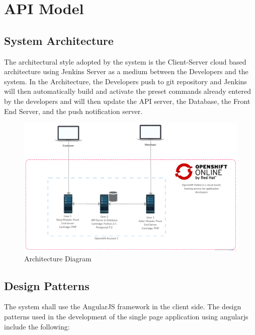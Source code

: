 \documentclass{report}
\begin{document}
\chapter{API Model}
\label{chap:API Model}
\section{System Architecture}
The architectural style adopted by the system is the Client-Server cloud based architecture using Jenkins Server as a medium between the Developers and the system. In the Architecture, the Developers push to git repository and Jenkins will then automatically build and activate the preset commands already entered by the developers and will then update the API server, the Database, the Front End Server, and the push notification server. 
\begin{figure}[h!]
\includegraphics[width=\linewidth]{Diagrams/ArchitectureDiagram.png}
\caption{Architecture Diagram}
\label{fig:ArchDia}
\end{figure}
\section{Design Patterns}
The system shall use the AngularJS framework in the client side. The design patterns used in the development of the single page application using angularjs include the following: 
\end{document}
